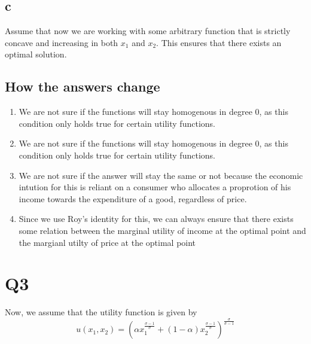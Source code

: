 \documentclass[12pt]{article}
\begin{document}
\subsection*{c}
Assume that now we are working with some arbitrary function that is
strictly concave and increasing in both $x_1$ and $x_2$. This ensures that there exists an optimal solution. 
\subsection*{How the answers change}
\begin{enumerate}[label=\alph*., start=6]
    \item We are not sure if the functions will stay homogenous in degree 0, as this condition only holds true for certain utility functions.
    \item We are not sure if the functions will stay homogenous in degree 0, as this condition only holds true for certain utility functions.
    \item We are not sure if the answer will stay the same or not because the economic intution for this is reliant on a consumer who allocates a proprotion of his income towards the expenditure of a good, regardless of price. 
    \item Since we use Roy's identity for this, we can always ensure that there exists some relation between the marginal utility of income at the optimal point and the margianl utilty of price at the optimal point
\end{enumerate}
\section*{Q3}
Now, we assume that the utility function is given by 
\[
u(x_1, x_2) = \left( \alpha x_1^{\frac{\sigma-1}{\sigma}} + (1-\alpha)x_2^{\frac{\sigma -1}{\sigma}} \right)^{\frac{\sigma}{\sigma -1}}
\]
\end{document}
